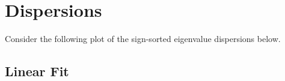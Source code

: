 %
%
%
%
%

\newpage
\section{Dispersions}

Consider the following plot of the sign-sorted eigenvalue dispersions below.

\subsection{Linear Fit}



\newpage
